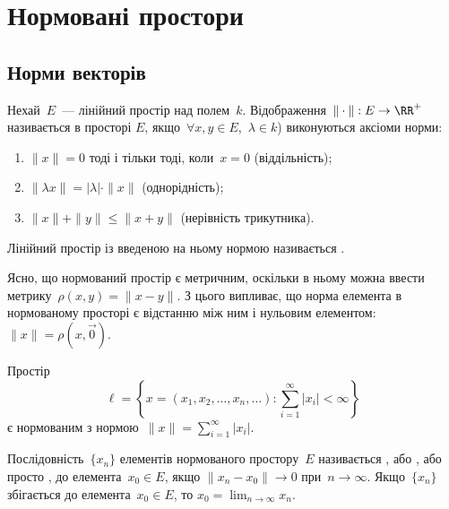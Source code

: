 \chapter{Нормовані простори}

\section{Норми векторів}

\begin{definition}
Нехай~$E$~--- лінійний простір над полем~$k$.
Відображення~$\|\cdot\|: E \to \RR^+$ називається  в просторі
$E$, якщо~$\forall x, y \in E$,~$\lambda \in k$) виконуються аксіоми норми:
\begin{enumerate}
\item $\|x\| = 0$ тоді і тільки тоді, коли~$x = 0$ (віддільність);
\item $\|\lambda x\| = |\lambda| \cdot \|x\|$ (однорідність);
\item $\|x\| + \|y\| \le \|x + y\|$ (нерівність трикутника).
\end{enumerate}
\end{definition}

\begin{definition}
Лінійний простір із введеною на ньому нормою
називається .
\end{definition}

\begin{remark}
Ясно, що нормований простір є метричним, оскільки в
ньому можна ввести метрику~$\rho(x, y) = \|x - y\|$. З цього
випливає, що норма елемента в нормованому просторі є
відстанню між ним і нульовим елементом: $\|x\| = \rho(x, \vec 0)$.
\end{remark}

\begin{example}
Простір
\begin{equation*}
    \ell = \left\{ x = (x_1, x_2, \dots, x_n, \dots): \sum_{i = 1}^\infty |x_i| < \infty \right\}
\end{equation*}
є нормованим з нормою~$\|x\| = \sum_{i = 1}^\infty |x_i|$.
\end{example}

\begin{definition}
Послідовність~$\{x_n\}$ елементів нормованого
простору~$E$ називається , або , або просто , до елемента~$x_0 \in E$, якщо
$\|x_n - x_0\| \to 0$ при~$n \to \infty$.
Якщо~$\{x_n\}$ збігається до елемента~$x_0 \in E$, то
$x_0 = \lim_{n \to \infty} x_n$.
\end{definition}

